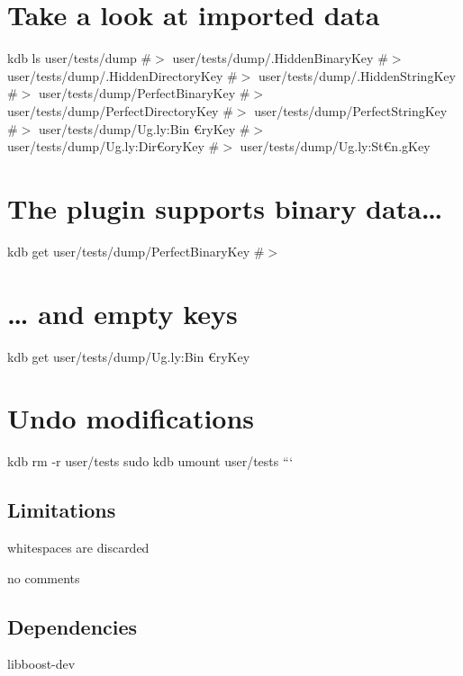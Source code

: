 \section*{Take a look at imported data}

kdb ls user/tests/dump \#$>$ user/tests/dump/.Hidden\+Binary\+Key \#$>$ user/tests/dump/.Hidden\+Directory\+Key \#$>$ user/tests/dump/.Hidden\+String\+Key \#$>$ user/tests/dump/\+Perfect\+Binary\+Key \#$>$ user/tests/dump/\+Perfect\+Directory\+Key \#$>$ user/tests/dump/\+Perfect\+String\+Key \#$>$ user/tests/dump/\+Ug.\+ly\+:Bin{\itshape } €ry\+Key \#$>$ user/tests/dump/\+Ug.\+ly\+:Dir€ory\+Key \#$>$ user/tests/dump/\+Ug.\+ly\+:St€n.\+g\+Key

\section*{The plugin supports binary data…}

kdb get user/tests/dump/\+Perfect\+Binary\+Key \#$>$ 

\section*{… and empty keys}

kdb get user/tests/dump/\+Ug.\+ly\+:Bin{\itshape } €ry\+Key

\section*{Undo modifications}

kdb rm -\/r user/tests sudo kdb umount user/tests ```

\subsection*{Limitations}


\begin{DoxyItemize}
\item whitespaces are discarded
\item no comments
\end{DoxyItemize}

\subsection*{Dependencies}


\begin{DoxyItemize}
\item {\ttfamily libboost-\/dev} 
\end{DoxyItemize}